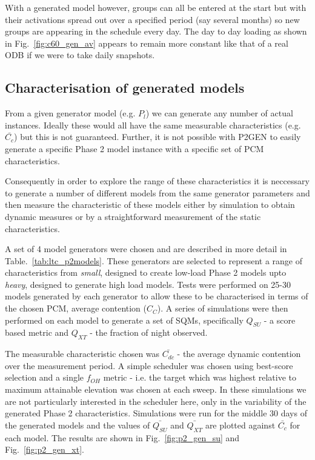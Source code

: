 With a generated model however, groups can all be entered at the start but with their activations spread out over a specified period (say several months) so new groups are appearing in the schedule every day. The day to day loading as shown in Fig.~\ref{fig:c60_gen_av} appears to remain more constant like that of a real ODB if we were to take daily snapshots. 


\subsection{Characterisation of generated models}
\label{sect:chargen}
 From a given generator model (e.g. $P_l$) we can generate any number of actual instances. Ideally these would all have the same measurable characteristics (e.g. $\bar{C_c}$) but this is not guaranteed. Further, it is not possible with P2GEN to easily generate a specific Phase 2 model instance with a specific set of PCM characteristics.

Consequently in order to explore the range of these characteristics it is neccessary to generate a number of different models from the same generator parameters and then measure the characteristic of these models either by simulation to obtain dynamic measures or by a straightforward measurement of the static characteristics.

A set of 4 model generators were chosen and are described in more detail in Table.~\ref{tab:ltc_p2models}. These generators are selected to represent a range of characteristics from \emph{small}, designed to create low-load Phase 2 models upto \emph{heavy}, designed to generate high load models. Tests were performed on 25-30 models generated by each generator to allow these to be characterised in terms of the chosen PCM, average contention ($C_C$). A series of simulations were then performed on each model to generate a set of SQMs, specifically $Q_{SU}$ - a score based metric and $Q_{XT}$ - the fraction of night observed. 

The measurable characteristic chosen was $\bar{C_{dc}}$ - the average dynamic contention over the measurement period. A simple scheduler was chosen using best-score selection and a single $f_{OH}$ metric - i.e. the target which was highest relative to maximum attainable elevation was chosen at each sweep. In these simulations we are not particularly interested in the scheduler here, only in the variability of the generated  Phase 2 characteristics. Simulations were run for the middle 30 days of the generated models and the values of $\bar{Q_{SU}}$ and $\bar{Q_{XT}}$ are plotted against $\bar{C_c}$ for each model. The results are shown in Fig.~\ref{fig:p2_gen_su} and  Fig.~\ref{fig:p2_gen_xt}.



